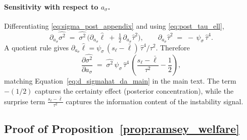 \documentclass[12pt]{article}
\theoremstyle{plain}
\begin{document}
\paragraph{Sensitivity with respect to $a_\sigma$.} Differentiating \eqref{eq:sigma_post_appendix} and using
\eqref{eq:post_tau_ell},
\[
	\partial_{a_\sigma}\widehat{\sigma^2}\;=\;\widehat{\sigma^2}\,\Big(\partial_{a_\sigma}\hat\ell\;+\;\tfrac12\,\partial_{a_\sigma}\hat\tau^2\Big),\qquad \partial_{a_\sigma}\hat\tau^2\;=\;-\,\psi_\sigma\,\hat\tau^4.
\]
A quotient rule gives
$\partial_{a_\sigma}\hat\ell=\psi_\sigma\,(s_\ell-\bar\ell)\,\hat\tau^4/\tau^2$.
Therefore
\begin{equation}\label{eq:d_sigmahat_da_appendix}
	\frac{\partial\widehat{\sigma^2}}{\partial a_\sigma}\;=\;\widehat{\sigma^2}\,\psi_\sigma\,\hat\tau^4\,\left(\frac{s_\ell-\bar\ell}{\tau^2}-\frac{1}{2}\right),
\end{equation}
matching Equation~\eqref{eq:d_sigmahat_da_main} in the main text. The term $-(1/2)$ captures the certainty effect (posterior concentration), while the surprise term $\tfrac{s_\ell-\bar\ell}{\tau^2}$ captures the information content of the instability signal.

\subsection{Proof of Proposition~\ref{prop:ramsey_welfare}}\label{app:proof_ramsey}
\end{document}
